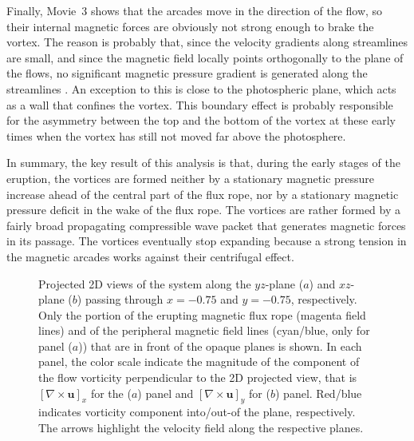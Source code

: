 \documentclass[apj]{emulateapj}
\begin{document}
Finally, Movie~3 shows that the arcades move in the direction of the flow, so their internal magnetic forces are obviously not strong enough to brake the vortex. The reason is probably that, since the velocity gradients along streamlines are small, and since the magnetic field locally points orthogonally to the plane of the flows, no significant magnetic pressure gradient is generated along the streamlines \citep[as also noted by][ in their 2.5D simulations]{Belmont2013}. An exception to this is close to the photospheric plane, which acts as a wall that confines the vortex. This 
boundary effect is probably responsible for the asymmetry between the top and the bottom of the vortex at these early times when the vortex has still not moved far above the photosphere. 

In summary, the key result of this analysis is that, during the early stages of the eruption, the vortices are formed neither by a stationary magnetic pressure increase ahead of the central part of the flux rope, nor by a stationary magnetic pressure deficit in the wake of the flux rope. The vortices are rather formed by a fairly broad propagating compressible wave packet that generates magnetic forces in its passage. The vortices eventually stop expanding because a strong tension in the magnetic arcades works against their centrifugal effect. 

\begin{figure*}[t!]
\begin{center}
%
\caption{Projected 2D views of the system along the $yz$-plane ($a$) and $xz$-plane ($b$) passing through $x= -0.75$ and $y=-0.75$, respectively. Only the portion  of the erupting magnetic flux rope (magenta field lines) and of the peripheral magnetic field lines (cyan/blue, only for panel ($a$)) that are in front of the opaque planes is shown.  In each panel, the color scale indicate the magnitude of the component of the flow vorticity perpendicular to the 2D projected view, that is  $[\nabla \times \mathbf{u}]_{x}$ for the ($a$) panel and $[\nabla \times \mathbf{u}]_{y}$ for ($b$) panel. Red/blue indicates vorticity component into/out-of the plane, respectively.  The arrows highlight the velocity field along the respective planes. } 
\label{Fig:Rot_u-xzview}
\end{center}
\end{figure*}
\end{document}
